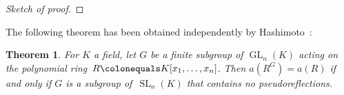 \documentclass[12pt]{amsart}
\newtheorem{theorem}{Theorem}[section]
\theoremstyle{definition}
\numberwithin{equation}{theorem}
\def\image{\operatorname{image}}
\def\GL{\operatorname{GL}}
\def\SL{\operatorname{SL}}
\def\Tr{\operatorname{Tr}}
\def\ff{\operatorname{frac}}
\def\frakn{\mathfrak{n}}
\def\to{\longrightarrow}
\begin{document}
\begin{proof}[Sketch of proof]

\end{proof}
%


The following theorem has been obtained independently by Hashimoto~\cite{Hashimoto}:

\begin{theorem}
\label{theorem:a:invariant}
For $K$ a field, let $G$ be a finite subgroup of $\GL_n(K)$ acting on the polynomial ring~$R\colonequals K[x_1,\dots,x_n]$. Then $a(R^G)=a(R)$ if and only if $G$ is a subgroup of~$\SL_n(K)$ that contains no pseudoreflections.
\end{theorem}
\end{document}
